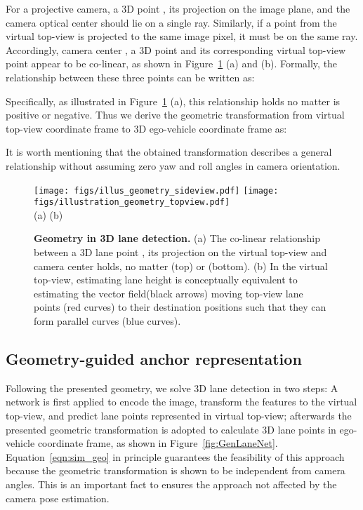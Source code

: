 \documentclass[10pt,twocolumn,letterpaper]{article}
\begin{document}
For a projective camera, a 3D point , its projection on the image plane, and the camera optical center  should lie on a single ray. Similarly, if a point  from the virtual top-view is projected to the same image pixel, it must be on the same ray. Accordingly, camera center , a 3D point  and its corresponding virtual top-view point  appear to be co-linear, as shown in Figure~\ref{fig:geo:transform} (a) and (b). Formally, the relationship between these three points can be written as:





Specifically, as illustrated in Figure~\ref{fig:geo:transform} (a), this relationship holds no matter  is positive or negative. Thus we derive the geometric transformation from virtual top-view coordinate frame to 3D ego-vehicle coordinate frame as:

It is worth mentioning that the obtained transformation describes a general relationship without assuming zero yaw and roll angles in camera orientation. 

\begin{figure}[!h]
  \centering
  \texttt{[image: figs/illus\_geometry\_sideview.pdf]}
  \texttt{[image: figs/illustration\_geometry\_topview.pdf]}\\
  \hspace{40pt}(a)  \hspace{100pt}(b)
\caption{\textbf{Geometry in 3D lane detection.} (a) The co-linear relationship between a 3D lane point , its projection on the virtual top-view  and camera center  holds, no matter  (top) or  (bottom). (b) In the virtual top-view, estimating lane height  is conceptually equivalent to estimating the vector field(black arrows) moving top-view lane points (red curves) to their destination positions such that they can form parallel curves (blue curves).}
  \label{fig:geo:transform}
\end{figure}

\subsection{Geometry-guided anchor representation}
\label{sec:sub:geo_anchor}

Following the presented geometry, we solve 3D lane detection in two steps: A network is first applied to encode the image, transform the features to the virtual top-view, and predict lane points represented in virtual top-view; afterwards the presented geometric transformation is adopted to calculate 3D lane points in ego-vehicle coordinate frame, as shown in Figure~\ref{fig:GenLaneNet}. Equation~\ref{eqn:sim_geo} in principle guarantees the feasibility of this approach because the geometric transformation is shown to be independent from camera angles. This is an important fact to ensures the approach not affected by the camera pose estimation.
 
\end{document}
